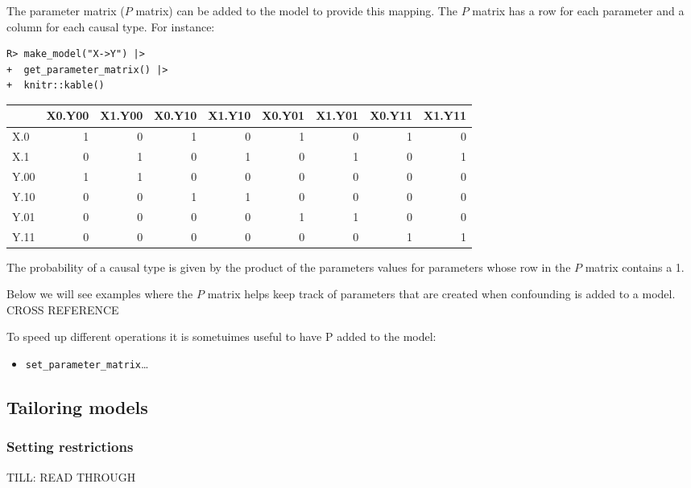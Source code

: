 \documentclass[
  11pt,
  article]{jss}
\providecommand{\tightlist}{%
  \setlength{\itemsep}{0pt}\setlength{\parskip}{0pt}}\usepackage{longtable,booktabs,array}
\begin{document}
The parameter matrix (\(P\) matrix) can be added to the model to provide
this mapping. The \(P\) matrix has a row for each parameter and a column
for each causal type. For instance:

\begin{verbatim}
R> make_model("X->Y") |> 
+  get_parameter_matrix() |>
+  knitr::kable()
\end{verbatim}

\begin{tabular}{l|r|r|r|r|r|r|r|r}
\hline
  & X0.Y00 & X1.Y00 & X0.Y10 & X1.Y10 & X0.Y01 & X1.Y01 & X0.Y11 & X1.Y11\\
\hline
X.0 & 1 & 0 & 1 & 0 & 1 & 0 & 1 & 0\\
\hline
X.1 & 0 & 1 & 0 & 1 & 0 & 1 & 0 & 1\\
\hline
Y.00 & 1 & 1 & 0 & 0 & 0 & 0 & 0 & 0\\
\hline
Y.10 & 0 & 0 & 1 & 1 & 0 & 0 & 0 & 0\\
\hline
Y.01 & 0 & 0 & 0 & 0 & 1 & 1 & 0 & 0\\
\hline
Y.11 & 0 & 0 & 0 & 0 & 0 & 0 & 1 & 1\\
\hline
\end{tabular}

The probability of a causal type is given by the product of the
parameters values for parameters whose row in the \(P\) matrix contains
a 1.

Below we will see examples where the \(P\) matrix helps keep track of
parameters that are created when confounding is added to a model. CROSS
REFERENCE

To speed up different operations it is sometuimes useful to have P added
to the model:

\begin{itemize}
\tightlist
\item
  \texttt{set\_parameter\_matrix}\ldots{}
\end{itemize}

\hypertarget{tailoring-models}{%
\subsection{Tailoring models}\label{tailoring-models}}

\hypertarget{restrictions}{%
\subsubsection{Setting restrictions}\label{restrictions}}

TILL: READ THROUGH
\end{document}
